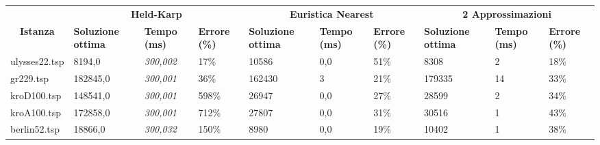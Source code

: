\begin{landscape}
	\begin{table}[]
		\centering
		\begin{tabular}{|l|l|l|l|l|l|l|l|l|l|}
			\hline
			\multicolumn{1}{|c|}{}                                   & \multicolumn{3}{c|}{\textbf{Held-Karp}}                                & \multicolumn{3}{c|}{\textbf{Euristica Nearest}}                        & \multicolumn{3}{c|}{\textbf{2 Approssimazioni}}                        \\ \cline{2-10} 
			\multicolumn{1}{|c|}{\multirow{-2}{*}{\textbf{Istanza}}} & \textbf{Soluzione ottima} & \textbf{Tempo (ms)} & \textbf{Errore (\%)} & \textbf{Soluzione ottima} & \textbf{Tempo (ms)} & \textbf{Errore (\%)} & \textbf{Soluzione ottima} & \textbf{Tempo (ms)} & \textbf{Errore (\%)} \\ \hline
			ulysses22.tsp                                            & 8194,0                    & \textit{300,002}    & 17\%                 & 10586                     & 0,0                 & 51\%                 & 8308                      & 2                   & 18\%                 \\ \hline
			\rowcolor[HTML]{C0C0C0} 
			gr229.tsp                                                & 182845,0                  & \textit{300,001}    & 36\%                 & 162430                    & 3                   & 21\%                 & 179335                    & 14                  & 33\%                 \\ \hline
			kroD100.tsp                                              & 148541,0                  & \textit{300,001}    & 598\%                & 26947                     & 0,0                 & 27\%                 & 28599                     & 2                   & 34\%                 \\ \hline
			\rowcolor[HTML]{C0C0C0} 
			kroA100.tsp                                              & 172858,0                  & \textit{300,001}    & 712\%                & 27807                     & 0,0                 & 31\%                 & 30516                     & 1                   & 43\%                 \\ \hline
			berlin52.tsp                                             & 18866,0                   & \textit{300,032}    & 150\%                & 8980                      & 0,0                 & 19\%                 & 10402                     & 1                   & 38\%                 \\ \hline

\end{tabular}
\end{table}
\end{landscape}
